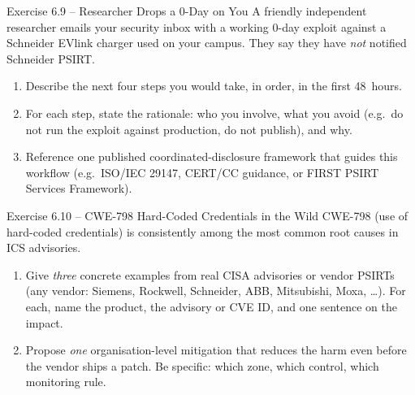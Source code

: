 \documentclass[11pt,a4paper]{article}
\begin{document}
\begin{taskbox}{Exercise 6.9 -- Researcher Drops a 0-Day on You}
A friendly independent researcher emails your security inbox with a
working 0-day exploit against a Schneider EVlink charger used on your
campus. They say they have \emph{not} notified Schneider PSIRT.

\begin{enumerate}
  \item Describe the next four steps you would take, in order, in
        the first 48~hours.
  \item For each step, state the rationale: who you involve, what
        you avoid (e.g.\ do not run the exploit against production,
        do not publish), and why.
  \item Reference one published coordinated-disclosure framework that
        guides this workflow (e.g.\ ISO/IEC 29147, CERT/CC guidance,
        or FIRST PSIRT Services Framework).
\end{enumerate}
\end{taskbox}

\begin{taskbox}{Exercise 6.10 -- CWE-798 Hard-Coded Credentials in the Wild}
CWE-798 (use of hard-coded credentials) is consistently among the most
common root causes in ICS advisories.

\begin{enumerate}
  \item Give \emph{three} concrete examples from real CISA advisories
        or vendor PSIRTs (any vendor: Siemens, Rockwell, Schneider,
        ABB, Mitsubishi, Moxa, \ldots). For each, name the product,
        the advisory or CVE ID, and one sentence on the impact.
  \item Propose \emph{one} organisation-level mitigation that reduces
        the harm even before the vendor ships a patch. Be specific:
        which zone, which control, which monitoring rule.
\end{enumerate}
\end{taskbox}
\end{document}

